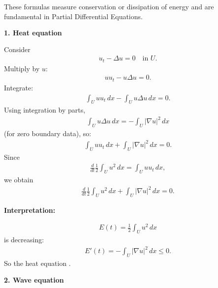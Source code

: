 \documentclass[12pt,a4paper]{report}
\begin{document}
\begin{description}
These formulas measure conservation or dissipation of energy and are fundamental in Partial Differential Equations.

\begin{description}
\item \textbf{1. Heat equation}

Consider
\begin{align*}
u_t-\Delta u=0 \quad\text{in }U.
\end{align*}
Multiply by $u$:
\begin{align*}
uu_t-u\Delta u=0.
\end{align*}
Integrate:
\begin{align*}
\int_U uu_t\,dx-\int_U u\Delta u\,dx=0.
\end{align*}
Using integration by parts,
\begin{align*}
\int_U u\Delta u\,dx=-\int_U |\nabla u|^2\,dx
\end{align*}
(for zero boundary data), so:
\begin{align*}
\int_U uu_t\,dx+\int_U |\nabla u|^2\,dx=0.
\end{align*}
Since
\begin{align*}
\frac{d}{dt}\frac12\int_U u^2\,dx = \int_U uu_t\,dx,
\end{align*}
we obtain
\begin{align*}
\boxed{
\frac{d}{dt}\frac12\int_U u^2\,dx + \int_U |\nabla u|^2\,dx = 0.  }
\end{align*}

\textbf{Interpretation:}

\begin{align*}
E(t)=\frac12\int_U u^2\,dx
\end{align*}
is decreasing:
\begin{align*}
E'(t)=-\int_U |\nabla u|^2\,dx\le 0.
\end{align*}
So the heat equation .

\item \textbf{2. Wave equation}


\end{description}
\end{description}
\end{document}
